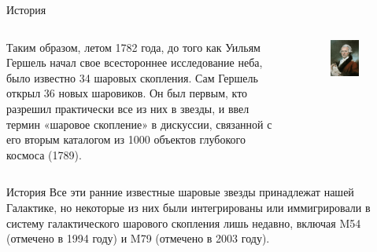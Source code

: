 \documentclass{beamer}
\begin{document}
    \begin{frame}{История}
        \begin{columns}
            \begin{column}{0.7\textwidth}
                Таким образом, летом 1782 года, до того как Уильям Гершель начал свое всестороннее исследование неба, 
                было известно 34 шаровых скопления. Сам Гершель открыл 36 новых шаровиков. Он был первым, кто разрешил практически все из них в звезды, 
                и ввел термин «шаровое скопление» в дискуссии, 
                связанной с его вторым каталогом из 1000 объектов глубокого космоса (1789).
            \end{column}
            \begin{column}{0.3\textwidth}
                \begin{figure}
                    \centering
                    \includegraphics[width=0.7\textwidth]{pictures/Gersh.jpg}
                \end{figure}
            \end{column}
        \end{columns}
    \end{frame}
    \begin{frame}{История}
        Все эти ранние известные шаровые звезды принадлежат нашей Галактике, 
        но некоторые из них были интегрированы или иммигрировали в систему галактического шарового скопления лишь недавно, 
        включая M54 (отмечено в 1994 году) и M79 (отмечено в 2003 году).
    \end{frame}
\end{document}
